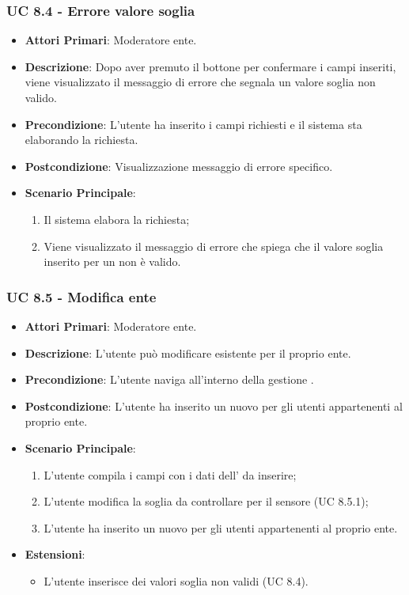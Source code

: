 			\subsubsection{UC 8.4 - Errore valore soglia}
			\begin{itemize}
				\item \textbf{Attori Primari}: Moderatore ente.
				\item \textbf{Descrizione}: Dopo aver premuto il bottone per confermare i campi inseriti, viene visualizzato il messaggio di errore che segnala un valore soglia non valido.
				\item \textbf{Precondizione}: L'utente ha inserito i campi richiesti e il sistema sta elaborando la richiesta.
				\item \textbf{Postcondizione}: Visualizzazione messaggio di errore specifico.
				\item \textbf{Scenario Principale}:
				\begin{enumerate}
					\item{Il sistema elabora la richiesta;}
					\item{Viene visualizzato il messaggio di errore che spiega che il valore soglia inserito per un  non è valido. }
				\end{enumerate}
			\end{itemize}
			
			\subsubsection{UC 8.5 - Modifica  ente}
			\begin{itemize}
				\item \textbf{Attori Primari}: Moderatore ente.
				\item \textbf{Descrizione}: L'utente può modificare  esistente per il proprio ente.
				\item \textbf{Precondizione}: L'utente naviga all'interno della gestione .
				\item \textbf{Postcondizione}: L'utente ha inserito un nuovo  per gli utenti appartenenti al proprio ente.
				\item \textbf{Scenario Principale}:
				\begin{enumerate}
					\item{L'utente compila i campi con i dati dell' da inserire;}
					\item L'utente modifica la soglia da controllare per il sensore (UC 8.5.1);
					\item{L'utente ha inserito un nuovo  per gli utenti appartenenti al proprio ente.}
				\end{enumerate}
				\item \textbf{Estensioni}:
				\begin{itemize}
					\item L'utente inserisce dei valori soglia non validi (UC 8.4).
				\end{itemize}		
			\end{itemize}


